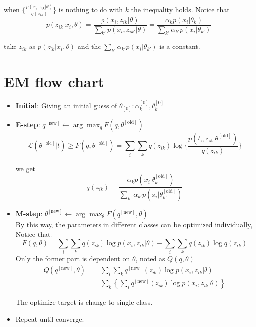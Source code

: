 \documentclass{article}
\begin{document}
when $\{\frac{p(x_i,z_{ik}|\theta)}{q(z_{ik})}\}$ is nothing to do with $k$ the inequality holds. Notice that
\begin{equation}
	p(z_{ik}|x_i,\theta) = \frac{p(x_i, z_{ik} |\theta)}{\sum_{k'} p(x_i , z_{ik'} | \theta)} = \frac{\alpha_k p(x_i|\theta_k)} {\sum_{k'} {\alpha_{k'} p(x_i|\theta_{k'})}}
\end{equation}

take $z_{ik}$ as $p(z_{ik}|x_i,\theta)$ and the $\sum_{k'} {\alpha_{k'} p(x_i|\theta_{k'})}$ is a constant.

\section{EM flow chart}
\begin{itemize}
	\item \textbf{Initial}: Giving an initial guess of $\theta_{[0]}: \alpha_{k}^{[0]}, \theta_{k}^{[0]}$
	\item \textbf{E-step}:
	      $q^{[\mathrm{new}]} \leftarrow \arg\max_q F(q,\theta^{[\mathrm{old}]})$
	      \begin{equation}
		      \mathcal{L}(\theta^{[\mathrm{old}]}|t) \geq F(q,\theta^{[\mathrm{old}]}) = \sum_i \sum_k q(z_{ik})\log\{\frac{p(t_{i},z_{ik}|\theta^{[\mathrm{old}]})}{q(z_{ik})}\}
	      \end{equation}

	      we get
	      \begin{equation}
		      q(z_{ik}) = \frac{\alpha_k p(x_i|\theta_k^{[\mathrm{old}]})} {\sum_{k'} {\alpha_{k'} p(x_i|\theta_{k'}^{[\mathrm{old}]})}}
	      \end{equation}

	\item \textbf{M-step}:
	      $\theta^{[\mathrm{new}]} \leftarrow \arg\max_{\theta} F(q^{[\mathrm{new}]},\theta)$\\
	      By this way, the parameters in different classes can be optimized individually, Notice that:
	      \begin{equation}
		      F(q,\theta) = \sum_i \sum_k q(z_{ik}) \log{p(x_{i}, z_{ik}|\theta)} - \sum_i \sum_k q(z_{ik}) \log{q(z_{ik})}
	      \end{equation}
	      Only the former part is dependent on $\theta$, noted as $Q(q,\theta)$
	      \begin{equation}
		      \begin{aligned}
			      Q(q^{[\mathrm{new}]},\theta) & = \sum_i \sum_k  q^{[\mathrm{new}]}(z_{ik})\log{p(x_i,z_{ik}|\theta)}               \\
			                                   & = \sum_k \left\{\sum_i q^{[\mathrm{new}]}(z_{ik})\log{p(x_i,z_{ik}|\theta)}\right\}
		      \end{aligned}
	      \end{equation}

	      The optimize target is change to single class.
	\item Repeat until converge.
\end{itemize}
\end{document}
